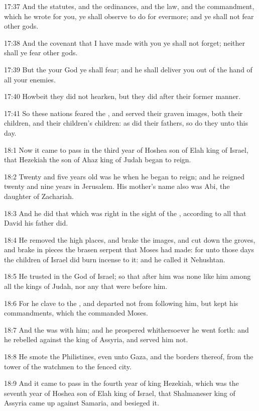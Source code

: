 17:37 And the statutes, and the ordinances, and the law, and the
commandment, which he wrote for you, ye shall observe to do for
evermore; and ye shall not fear other gods.

17:38 And the covenant that I have made with you ye shall not forget;
neither shall ye fear other gods.

17:39 But the \LORD your God ye shall fear; and he shall deliver you
out of the hand of all your enemies.

17:40 Howbeit they did not hearken, but they did after their former
manner.

17:41 So these nations feared the \LORD, and served their graven
images, both their children, and their children's children: as did
their fathers, so do they unto this day.

18:1 Now it came to pass in the third year of Hoshea son of Elah king
of Israel, that Hezekiah the son of Ahaz king of Judah began to reign.

18:2 Twenty and five years old was he when he began to reign; and he
reigned twenty and nine years in Jerusalem. His mother's name also was
Abi, the daughter of Zachariah.

18:3 And he did that which was right in the sight of the \LORD,
according to all that David his father did.

18:4 He removed the high places, and brake the images, and cut down
the groves, and brake in pieces the brasen serpent that Moses had
made: for unto those days the children of Israel did burn incense to
it: and he called it Nehushtan.

18:5 He trusted in the \LORD God of Israel; so that after him was none
like him among all the kings of Judah, nor any that were before him.

18:6 For he clave to the \LORD, and departed not from following him,
but kept his commandments, which the \LORD commanded Moses.

18:7 And the \LORD was with him; and he prospered whithersoever he went
forth: and he rebelled against the king of Assyria, and served him
not.

18:8 He smote the Philistines, even unto Gaza, and the borders
thereof, from the tower of the watchmen to the fenced city.

18:9 And it came to pass in the fourth year of king Hezekiah, which
was the seventh year of Hoshea son of Elah king of Israel, that
Shalmaneser king of Assyria came up against Samaria, and besieged it.

